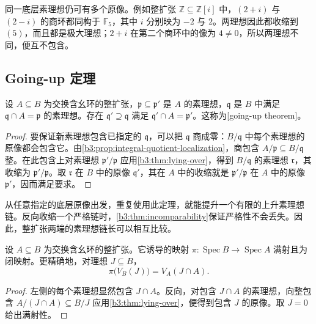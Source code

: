 同一底层素理想仍可有多个原像。例如整扩张 \(\mathbb Z\subseteq\mathbb Z[i]\) 中，\((2+i)\) 与 \((2-i)\) 的商环都同构于 \(\mathbb F_5\)，其中 \(i\) 分别映为 \(-2\) 与 \(2\)。两理想因此都收缩到 \((5)\)，而且都是极大理想；\(2+i\) 在第二个商环中的像为 \(4\ne0\)，所以两理想不同，便互不包含。

\subsection{Going-up 定理}\label{b3:subsec:0502:03}

\begin{theorem}[Going-up]\label{b3:thm:going-up}
	设 \(A\subseteq B\) 为交换含幺环的整扩张，\(\mathfrak p\subseteq\mathfrak p'\) 是 \(A\) 的素理想，\(\mathfrak q\) 是 \(B\) 中满足 \(\mathfrak q\cap A=\mathfrak p\) 的素理想。存在 \(\mathfrak q'\supseteq\mathfrak q\) 满足 \(\mathfrak q'\cap A=\mathfrak p'\)。这称为[going-up theorem]。
\end{theorem}
\begin{proof}
	要保证新素理想包含已指定的 \(\mathfrak q\)，可以把 \(\mathfrak q\) 商成零：\(B/\mathfrak q\) 中每个素理想的原像都会包含它。由\cref{b3:prop:integral-quotient-localization}，商包含 \(A/\mathfrak p\subseteq B/\mathfrak q\) 整。在此包含上对素理想 \(\mathfrak p'/\mathfrak p\) 应用\cref{b3:thm:lying-over}，得到 \(B/\mathfrak q\) 的素理想 \(\mathfrak r\)，其收缩为 \(\mathfrak p'/\mathfrak p\)。取 \(\mathfrak r\) 在 \(B\) 中的原像 \(\mathfrak q'\)，其在 \(A\) 中的收缩就是 \(\mathfrak p'/\mathfrak p\) 在 \(A\) 中的原像 \(\mathfrak p'\)，因而满足要求。
\end{proof}

从任意指定的底层原像出发，重复使用此定理，就能提升一个有限的上升素理想链。反向收缩一个严格链时，\cref{b3:thm:incomparability}保证严格性不会丢失。因此，整扩张两端的素理想链长可以相互比较。

\begin{proposition}\label{b3:prop:integral-spec-closed}
	设 \(A\subseteq B\) 为交换含幺环的整扩张。它诱导的映射 \(\pi:\operatorname{Spec}B\to\operatorname{Spec}A\) 满射且为闭映射。更精确地，对理想 \(J\subseteq B\)，
	\[
		\pi\bigl(V_B(J)\bigr)=V_A(J\cap A).
	\]
\end{proposition}
\begin{proof}
	左侧的每个素理想显然包含 \(J\cap A\)。反向，对包含 \(J\cap A\) 的素理想，向整包含 \(A/(J\cap A)\subseteq B/J\) 应用\cref{b3:thm:lying-over}，便得到包含 \(J\) 的原像。取 \(J=0\) 给出满射性。
\end{proof}

